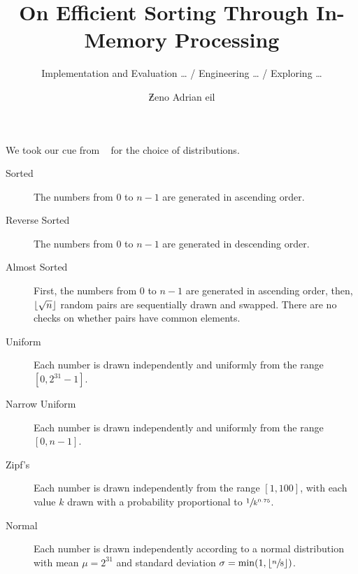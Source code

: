 \documentclass[draft, british, oneside]{../garticle}
\title{On Efficient Sorting Through In-Memory Processing}
\subtitle{Implementation and Evaluation \dots{} / Engineering \dots{} / Exploring \dots{}}
\author{\texorpdfstring{Ƶ}{Z}eno Adrian \texorpdfstring{\Lss05{W\kern-1.5pt}}{W}eil}
\begin{document}


%	

	\tableofcontents

	\listoftodos

	\begingroup
	\endgroup

	\bigskip

	We took our cue from \citeauthor{axtmann2020engineering}~\cite{axtmann2020engineering} for the choice of distributions.
	\begin{description}
		\item[Sorted]
		The numbers from \(0\) to \(n - 1\) are generated in ascending order.

		\item[Reverse Sorted]
		The numbers from \(0\) to \(n - 1\) are generated in descending order.

		\item[Almost Sorted]
		First, the numbers from \(0\) to \(n - 1\) are generated in ascending order, then, \(\lfloor\sqrt{n}\rfloor\) random pairs are sequentially drawn and swapped.
		There are no checks on whether pairs have common elements.

		\item[Uniform]
		Each number is drawn independently and uniformly from the range \([0, 2^{31} - 1]\).

		\item[Narrow Uniform]
		Each number is drawn independently and uniformly from the range \([0, n - 1]\).

		\item[Zipf's]
		Each number is drawn independently from the range \([1, 100]\), with each value \(k\) drawn with a probability proportional to \(\sfrac{1}{k^{0.75}}\).

		\item[Normal]
		Each number is drawn independently according to a normal distribution with mean \(\mu = 2^{31}\) and standard deviation \(\sigma = \min\paren*{1, \floor*{\sfrac{n}{8}}}\).
	\end{description}

	

	\appendix

	

	\mybibliography[heading=bibintoc]
\end{document}
